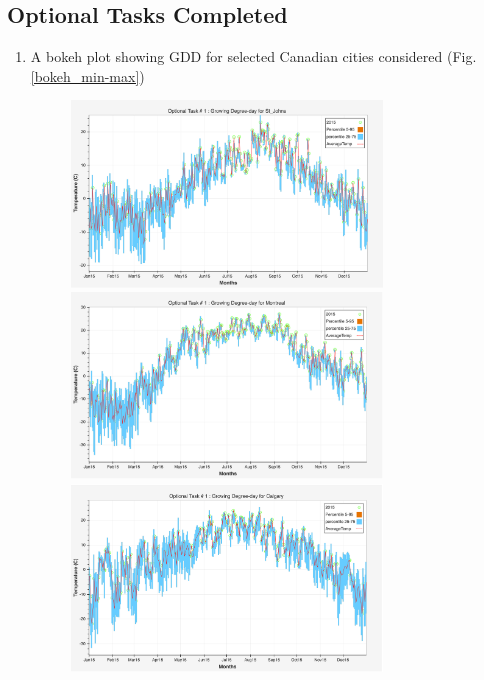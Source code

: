\documentclass{article}
\begin{document}
\subsection{ \bf Optional Tasks Completed}
\begin{enumerate}
\item A bokeh plot showing GDD for selected Canadian cities considered (Fig. \ref{bokeh_min-max})
\begin{center}
\begin{figure}[!h] 
\includegraphics[width=3.25in]{./source/Report/op-task-1_st_johns.png}\\

\includegraphics[width=3.25in]{./source/Report/op-task-1_montreal.png}\\

\includegraphics[width=3.25in]{./source/Report/op-task-1_calgary.png}\\


\end{figure}
\end{center}
\end{enumerate}
\end{document}

